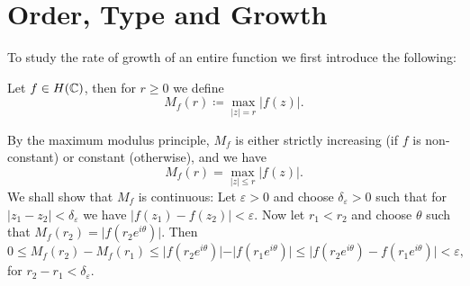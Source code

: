 \section{Order, Type and Growth}

To study the rate of growth of an entire function we first introduce the following:
\begin{definition}
    Let $f \in H(\mathbb{C})$, then for $r \geq 0$ we define
    \begin{equation*}
        M_f(r) \coloneqq \max_{\vert z \vert = r} \vert f(z) \vert.
    \end{equation*}
\end{definition}

\begin{remark}    
    By the maximum modulus principle, $M_f$ is either strictly increasing (if $f$ is non-constant) or constant (otherwise), and we have
    $$ M_f(r) = \max_{\vert z \vert \leq r} \vert f(z) \vert. $$
    We shall show that $M_f$ is continuous: Let $\varepsilon > 0$ and choose $\delta_\varepsilon > 0$ such that for ${\vert z_1 - z_2 \vert < \delta_\varepsilon}$ we have ${\vert f(z_1) - f(z_2) \vert < \varepsilon}$. Now let $r_1 < r_2$ and choose $\theta$ such that $M_f(r_2) = \vert f(r_2 e^{i \theta}) \vert$. Then
    \begin{equation*}
        0 \leq M_f(r_2) - M_f(r_1) \leq \vert f(r_2 e^{i \theta}) \vert - \vert f(r_1 e^{i \theta}) \vert \leq \vert f(r_2 e^{i \theta}) - f(r_1 e^{i \theta}) \vert < \varepsilon,
    \end{equation*}
    for $r_2 - r_1 < \delta_\varepsilon$.
\end{remark}




